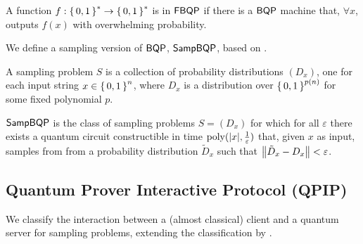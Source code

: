 \begin{definition} [$\FBQP$]
	A function $f:\set{0,1}^*\rightarrow\set{0,1}^*$ is in $\FBQP$ if there is a $\operatorname{\mathsf{BQP}}$ machine that, $\forall x$, outputs $f(x)$ with overwhelming probability.
\end{definition}

We define a sampling version of $\operatorname{\mathsf{BQP}}$, $\SampBQP$, based on \cite{aaronson_2013}.

\begin{definition} 
	A sampling problem $S$ is a collection of probability distributions $(D_x)$, one for each input string $x\in\set{0,1}^n$, where $D_x$ is a distribution over $\set{0,1}^{p(n)}$ for some fixed polynomial $p$.
\end{definition}

\begin{definition} [$\SampBQP$]
	$\SampBQP$ is the class of sampling problems $S=(D_x)$ for which for all $\varepsilon$ there exists a quantum circuit constructible in time $\operatorname*{\operatorname{poly}}(|x|, \frac{1}{\varepsilon})$ that, given $x$ as input, samples from from a probability distribution $\tilde{D}_x$ such that $\left\lVert\tilde{D}_x-D_x\right\rVert<\varepsilon$.
\end{definition}

\subsection{Quantum Prover Interactive Protocol (QPIP)}
We classify the interaction between a (almost classical) client and a quantum server for sampling problems, extending the classification by \cite{FOCS:Mahadev18a}.


